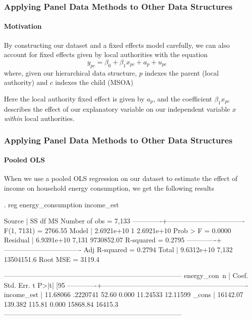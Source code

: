 \documentclass{beamer}
\begin{document}
  \begin{frame}
    \frametitle{Applying Panel Data Methods to Other Data Structures}
    \framesubtitle{Motivation}
    
    By constructing our dataset and a fixed effects model carefully, we can also account for fixed effects given by local authorities with the equation
    $$ y_{pc} = \beta_{0} + \beta_{1}x_{pc} + a_{p} + u_{pc} $$
    where, given our hierarchical data structure, $p$ indexes the parent (local authority) and $c$ indexes the child (MSOA)
    
    \bigskip
    
    Here the local authority fixed effect is given by $a_{p}$, and the coefficient $\beta_{1}x_{pc}$ describes the effect of our explanatory variable on our independent variable $x$ \textit{within} local authorities.
    
  \end{frame}
  
\begin{frame}[fragile]
    \frametitle{Applying Panel Data Methods to Other Data Structures}
    \framesubtitle{Pooled OLS}
    When we use a pooled OLS regression on our dataset to estimate the effect of income on household energy consumption, we get the following results
    \begin{CVerbatim}[fontsize=\tiny]
. reg energy_consumption income_est

      Source |       SS           df       MS      Number of obs   =     7,133
-------------+----------------------------------   F(1, 7131)      =   2766.55
       Model |  2.6921e+10         1  2.6921e+10   Prob > F        =    0.0000
    Residual |  6.9391e+10     7,131  9730852.07   R-squared       =    0.2795
-------------+----------------------------------   Adj R-squared   =    0.2794
       Total |  9.6312e+10     7,132  13504151.6   Root MSE        =    3119.4

------------------------------------------------------------------------------
energy_con~n |      Coef.   Std. Err.      t    P>|t|     [95%
-------------+----------------------------------------------------------------
  income_est |   11.68066   .2220741    52.60   0.000     11.24533    12.11599
       _cons |   16142.07    139.382   115.81   0.000     15868.84     16415.3
------------------------------------------------------------------------------

    \end{CVerbatim}
    
\end{frame}
  
\end{document}
